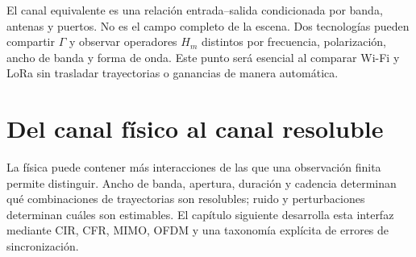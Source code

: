 El canal equivalente es una relación entrada--salida condicionada por banda,
antenas y puertos. No es el campo completo de la escena. Dos tecnologías pueden
compartir $\Gamma$ y observar operadores $H_m$ distintos por frecuencia,
polarización, ancho de banda y forma de onda. Este punto será esencial al comparar
Wi-Fi y LoRa sin trasladar trayectorias o ganancias de manera automática.

\section{Del canal físico al canal resoluble}

La física puede contener más interacciones de las que una observación finita
permite distinguir. Ancho de banda, apertura, duración y cadencia determinan qué
combinaciones de trayectorias son resolubles; ruido y perturbaciones determinan
cuáles son estimables. El capítulo siguiente desarrolla esta interfaz mediante
CIR, CFR, MIMO, OFDM y una taxonomía explícita de errores de sincronización.
